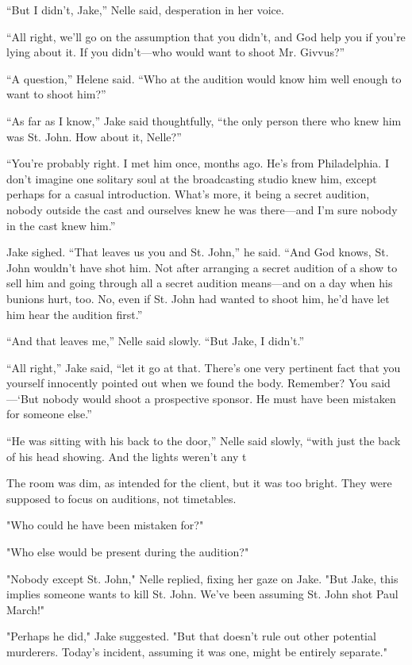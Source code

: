 \documentclass{novel}
\begin{document}
“But I didn’t, Jake,” Nelle said, desperation in her voice.

“All right, we’ll go on the assumption that you didn’t, and God help you if you’re lying about it. If you didn’t—who would want to shoot Mr. Givvus?”

“A question,” Helene said. “Who at the audition would know him well enough to want to shoot him?”

“As far as I know,” Jake said thoughtfully, “the only person there who knew him was St. John. How about it, Nelle?”

“You’re probably right. I met him once, months ago. He’s from Philadelphia. I don’t imagine one solitary soul at the broadcasting studio knew him, except perhaps for a casual introduction. What’s more, it being a secret audition, nobody outside the cast and ourselves knew he was there—and I’m sure nobody in the cast knew him.”

Jake sighed. “That leaves us you and St. John,” he said. “And God knows, St. John wouldn’t have shot him. Not after arranging a secret audition of a show to sell him and going through all a secret audition means—and on a day when his bunions hurt, too. No, even if St. John had wanted to shoot him, he’d have let him hear the audition first.”

“And that leaves me,” Nelle said slowly. “But Jake, I didn’t.”

“All right,” Jake said, “let it go at that. There’s one very pertinent fact that you yourself innocently pointed out when we found the body. Remember? You said—‘But nobody would shoot a prospective sponsor. He must have been mistaken for someone else.”

“He was sitting with his back to the door,” Nelle said slowly, “with just the back of his head showing. And the lights weren’t any t

The room was dim, as intended for the client, but it was too bright. They were supposed to focus on auditions, not timetables.

"Who could he have been mistaken for?"

"Who else would be present during the audition?"

"Nobody except St. John," Nelle replied, fixing her gaze on Jake. "But Jake, this implies someone wants to kill St. John. We've been assuming St. John shot Paul March!"

"Perhaps he did," Jake suggested. "But that doesn't rule out other potential murderers. Today's incident, assuming it was one, might be entirely separate."
\end{document}
